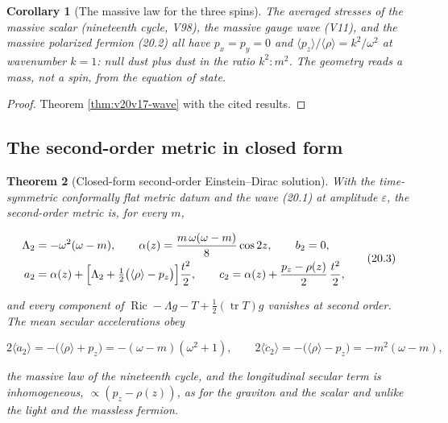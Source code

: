 \documentclass[11pt]{article}
\newtheorem{theorem}{Theorem}[section]
\newtheorem{corollary}[theorem]{Corollary}
\theoremstyle{remark}
\begin{document}
\begin{corollary}[The massive law for the three spins]
\label{cor:v20v17-law}
The averaged stresses of the massive scalar (nineteenth cycle, V98),
the massive gauge wave (V11), and the massive polarized fermion
(20.2) all have \(p_x=p_y=0\) and \(\langle p_z\rangle/\langle\rho\rangle=k^2/\omega^2\)
at wavenumber \(k=1\): null dust plus dust in the ratio \(k^2:m^2\).
The geometry reads a mass, not a spin, from the equation of state.
\end{corollary}

\begin{proof}
Theorem \ref{thm:v20v17-wave} with the cited results.
\end{proof}

\subsection{The second-order metric in closed form}

\begin{theorem}[Closed-form second-order Einstein--Dirac solution]
\label{thm:v20v17-second}
With the time-symmetric conformally flat metric datum and the wave
(20.1) at amplitude \(\varepsilon\), the second-order metric is, for
every \(m\),

\[
\begin{aligned}
 \Lambda_2&=-\omega^2(\omega-m),\qquad
 \alpha(z)=\frac{m\,\omega(\omega-m)}8\cos2z,\qquad b_2=0,\\
 a_2&=\alpha(z)+\Bigl[\Lambda_2+\tfrac12\bigl(\langle\rho\rangle-p_z\bigr)\Bigr]\frac{t^2}2,\qquad
 c_2=\alpha(z)+\frac{p_z-\rho(z)}2\,\frac{t^2}2,
\end{aligned}                                                          \tag{20.3}
\]

and every component of \(\operatorname{Ric}-\Lambda g-T+\tfrac12(\operatorname{tr}T)g\)
vanishes at second order.  The mean secular accelerations obey

\[
 2\langle\ddot a_2\rangle=-\bigl(\langle\rho\rangle+p_z\bigr)=-(\omega-m)(\omega^2+1),\qquad
 2\langle\ddot c_2\rangle=-\bigl(\langle\rho\rangle-p_z\bigr)=-m^2(\omega-m),
                                                                    \tag{20.4}
\]

the massive law of the nineteenth cycle, and the longitudinal
secular term is inhomogeneous, \(\propto(p_z-\rho(z))\), as for the
graviton and the scalar and unlike the light and the massless fermion.
\end{theorem}
\end{document}
